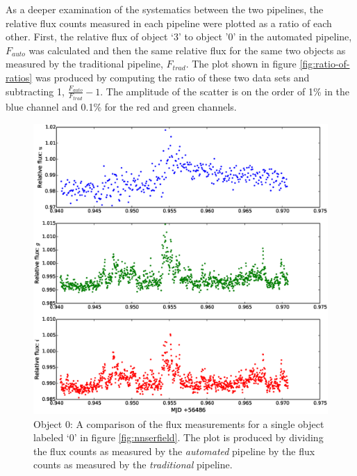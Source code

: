 As a deeper examination of the systematics between the two pipelines, the relative flux counts measured in each pipeline were plotted as a ratio of each other. First, the relative flux of object `3' to object '0' in the automated pipeline, $F_{auto}$ was calculated and then the same relative flux for the same two objects as measured by the traditional pipeline, $F_{trad}$. The plot shown in figure  \ref{fig:ratio-of-ratios} was produced by computing the ratio of these two data sets and subtracting 1,  $\frac{F_{auto}}{F_{trad}} - 1$. The amplitude of the scatter is on the order of 1\% in the blue channel and 0.1\% for the red and green channels. 

\begin{figure}
\centering
\includegraphics[width=140mm]{images/compare_photometry.eps}
\caption{Object 0: A comparison of the flux measurements for a single object labeled `0' in figure \ref{fig:nnserfield}. The plot is produced by dividing the flux counts as measured by the \emph{automated} pipeline by the flux counts as measured by the \emph{traditional} pipeline.}
\label{fig:comparephotometry}
\end{figure}

